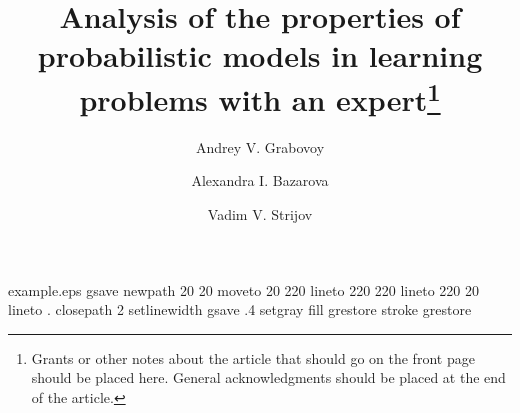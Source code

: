 %
%
%
%
%
\begin{filecontents*}{example.eps}
gsave
newpath
  20 20 moveto
  20 220 lineto
  220 220 lineto
  220 20 lineto .   
closepath
2 setlinewidth
gsave
  .4 setgray fill
grestore
stroke
grestore
\end{filecontents*}
\RequirePackage{fix-cm}
%
\documentclass[smallextended]{svjour3}       %
%
\smartqed  %
%
\usepackage{graphicx}
\usepackage{subfig}
\usepackage{amsmath}
\usepackage{amsfonts}
%
%
%
%
%


\title{Analysis of the properties of probabilistic models in learning problems with an expert\thanks{Grants or other notes
about the article that should go on the front page should be
placed here. General acknowledgments should be placed at the end of the article.}
}
\subtitle{}


\author{Andrey V. Grabovoy        \and
            Alexandra I. Bazarova  \and
            Vadim V. Strijov
}


